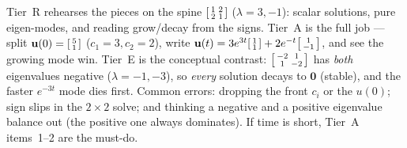 \documentclass[10pt]{article}
\newcommand{\uu}{\mathbf{u}}
\newcommand{\zero}{\mathbf{0}}
\begin{document}
\begin{teachernote}
Tier~R rehearses the pieces on the spine $\begin{bsmallmatrix}1&2\\2&1\end{bsmallmatrix}$ ($\lambda=3,-1$):
scalar solutions, pure eigen-modes, and reading grow/decay from the signs. Tier~A is the full job --- split
$\uu(0)=\begin{bsmallmatrix}5\\1\end{bsmallmatrix}$ ($c_1=3,c_2=2$), write $\uu(t)=3e^{3t}\begin{bsmallmatrix}1\\1\end{bsmallmatrix}+2e^{-t}\begin{bsmallmatrix}1\\-1\end{bsmallmatrix}$, and see the growing mode win. Tier~E is the
conceptual contrast: $\begin{bsmallmatrix}-2&1\\1&-2\end{bsmallmatrix}$ has \emph{both} eigenvalues negative
($\lambda=-1,-3$), so \emph{every} solution decays to $\zero$ (stable), and the faster $e^{-3t}$ mode dies
first. Common errors: dropping the front $c_i$ or the $u(0)$; sign slips in the $2\times2$ solve; and thinking
a negative and a positive eigenvalue balance out (the positive one always dominates). If time is short,
Tier~A items~1--2 are the must-do.
\end{teachernote}
\end{document}
